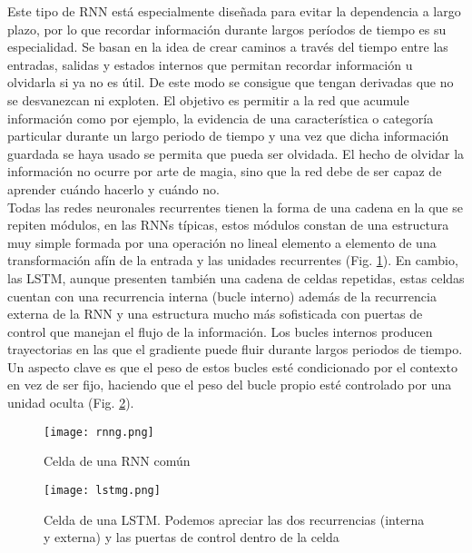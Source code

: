     Este tipo de RNN está especialmente diseñada para evitar la dependencia a largo plazo, por lo que recordar información durante largos períodos de tiempo es su especialidad. Se basan en la idea de crear caminos a través del tiempo entre las entradas, salidas y estados internos que permitan recordar información u olvidarla si ya no es útil. De este modo se consigue que tengan derivadas que no se desvanezcan ni exploten. El objetivo es permitir a la red que acumule información como por ejemplo, la evidencia de una característica o categoría particular durante un largo periodo de tiempo y una vez que dicha información guardada se haya usado se permita que pueda ser olvidada. El hecho de olvidar la información no ocurre por arte de magia, sino que la red debe de ser capaz de aprender cuándo hacerlo y cuándo no.  \\
        
    Todas las redes neuronales recurrentes tienen la forma de una cadena en la que se repiten módulos, en las RNNs  típicas, estos módulos constan de una estructura muy simple formada por una operación no lineal elemento a elemento de una transformación afín de la entrada y las unidades recurrentes (Fig. \ref{fig:celda RNN}). En cambio, las LSTM, aunque presenten también una cadena de celdas repetidas, estas celdas cuentan con una recurrencia interna (bucle interno) además de la recurrencia externa de la RNN y una estructura mucho más sofisticada con puertas de control que manejan el flujo de la información. Los bucles internos producen trayectorias en las que el gradiente puede fluir durante largos periodos de tiempo. Un aspecto clave es que el peso de estos bucles esté condicionado por el contexto en vez de ser fijo, haciendo que el peso del bucle propio esté controlado por una unidad oculta (Fig. \ref{fig:celda LSTM}).\\
    
    
    \begin{figure}[H]
        \centering
        \texttt{[image: rnng.png]}
        \caption{Celda de una RNN común}
        \label{fig:celda RNN}
    \end{figure}
    
    \begin{figure}[H]
        \centering
        \texttt{[image: lstmg.png]}
        \caption{Celda de una LSTM. Podemos apreciar las dos recurrencias (interna y externa) y las puertas de control dentro de la celda}
        \label{fig:celda LSTM}
    \end{figure}
    
